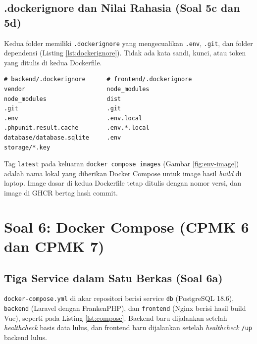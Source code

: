 \documentclass[a4paper,oneside,12pt]{report}
\begin{document}
\subsection{.dockerignore dan Nilai Rahasia (Soal 5c dan 5d)}
Kedua folder memiliki \texttt{.dockerignore} yang mengecualikan \texttt{.env}, \texttt{.git}, dan folder dependensi (Listing \ref{lst:dockerignore}). Tidak ada kata sandi, kunci, atau token yang ditulis di kedua Dockerfile.

\begin{lstlisting}[style=bashstyle,caption={Isi backend/.dockerignore (kiri) dan frontend/.dockerignore (kanan) digabung.},label={lst:dockerignore}]
# backend/.dockerignore      # frontend/.dockerignore
vendor                       node_modules
node_modules                 dist
.git                         .git
.env                         .env.local
.phpunit.result.cache        .env.*.local
database/database.sqlite     .env
storage/*.key
\end{lstlisting}

Tag \texttt{latest} pada keluaran \texttt{docker compose images} (Gambar \ref{fig:env-image}) adalah nama lokal yang diberikan Docker Compose untuk image hasil \textit{build} di laptop. Image dasar di kedua Dockerfile tetap ditulis dengan nomor versi, dan image di GHCR bertag hash commit.

\section{Soal 6: Docker Compose (CPMK 6 dan CPMK 7)}\label{sec:soal6}

\subsection{Tiga Service dalam Satu Berkas (Soal 6a)}
\texttt{docker-compose.yml} di akar repositori berisi service \texttt{db} (PostgreSQL 18.6), \texttt{backend} (Laravel dengan FrankenPHP), dan \texttt{frontend} (Nginx berisi hasil build Vue), seperti pada Listing \ref{lst:compose}. Backend baru dijalankan setelah \textit{healthcheck} basis data lulus, dan frontend baru dijalankan setelah \textit{healthcheck} \texttt{/up} backend lulus.
\end{document}
